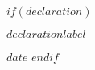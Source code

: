 
$if(declaration)$
\cleardoublepage

\thispagestyle{empty}

\vspace*{\fill}

\textbf{$declarationlabel$}


\vspace{20mm}

\noindent\textit{$date$}
$endif$
